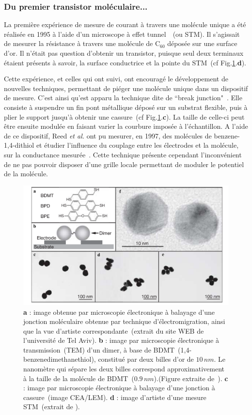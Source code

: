 \subsubsection*{Du premier transistor moléculaire...}
La première expérience de mesure de courant à travers une molécule unique a été réalisée en 1995 à l'aide d'un microscope à effet tunnel~\cite{Joachim1995}~(ou STM). Il s'agissait de mesurer la résistance à travers une molécule de C$_{60}$ déposée sur une surface d'or. Il n'était pas question d'obtenir un transistor, puisque seul deux terminaux étaient présents à savoir, la surface conductrice et la pointe du STM~(cf Fig.\ref{MolSpintro2}.\textbf{d}).

Cette expérience, et celles qui ont suivi, ont encouragé le développement de nouvelles techniques, permettant de piéger une molécule unique dans un dispositif de mesure. C'est ainsi qu'est apparu la technique dite de ``break junction"~\cite{Zhou1995}. Elle consiste à suspendre un fin pont métallique déposé sur un substrat flexible, puis à plier le support jusqu'à obtenir une cassure~(cf Fig.\ref{MolSpintro2}.\textbf{c}). La taille de celle-ci peut être ensuite modulée en faisant varier la courbure imposée à l'échantillon. A l'aide de ce dispositif, Reed \textit{et al.} ont pu mesurer, en 1997, des molécules de benzene-1,4-dithiol et étudier l'influence du couplage entre les électrodes et la molécule, sur la conductance mesurée~\cite{Reed1997}. Cette technique présente cependant l'inconvénient de ne pas pouvoir disposer d'une grille locale permettant de moduler le potentiel de la molécule.

\begin{figure}
\centering \includegraphics[scale=0.45]{Spintronique/MolSpintro2/MolSpintro2.pdf}
\caption{\textbf{a} : image obtenue par microscopie électronique à balayage d'une jonction moléculaire obtenue par technique d'électromigration, ainsi que la vue d'artiste correspondante~(extrait du site WEB de l'université de Tel Aviv). \textbf{b} : image par microscopie électronique à transmission~(TEM) d'un dimer, à base de BDMT~(1,4-
benzenedimethanethiol), constitué par deux billes d'or de $10\,nm$. Le nanomètre qui sépare les deux billes correspond approximativement à la taille de la molécule de BDMT~($0.9\,nm$).(Figure extraite de~\cite{Dadosh2005}). \textbf{c} : image par microscopie électronique à balayage d'une jonction à cassure~(image CEA/LEM). \textbf{d} : image d'artiste d'une mesure STM~(extrait de \cite{Leary2011}).}
\label{MolSpintro2}
\end{figure}


